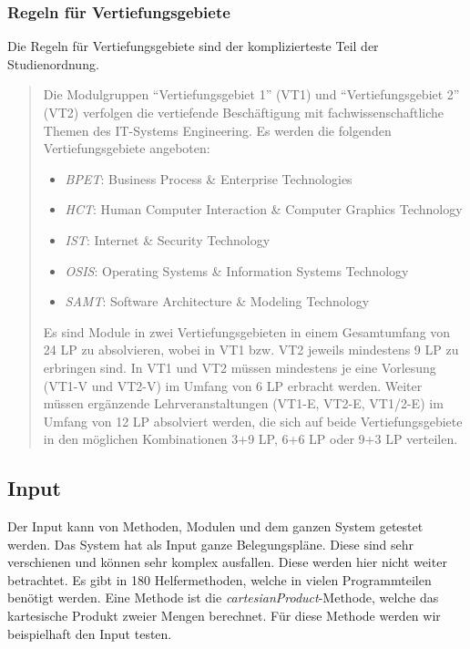 \documentclass[ngerman]{article}
\begin{document}
\subsubsection{Regeln für Vertiefungsgebiete}

Die Regeln für Vertiefungsgebiete sind der komplizierteste Teil der Studienordnung.
\begin{quote}
    \begin{displayquote}
Die Modulgruppen ``Vertiefungsgebiet 1'' (VT1) und ``Vertiefungsgebiet 2'' (VT2) verfolgen die vertiefende Beschäftigung mit fachwissenschaftliche Themen des IT-Systems Engineering.
Es werden die folgenden Vertiefungsgebiete angeboten:
\begin{itemize}
    \item \emph{BPET}: Business Process \& Enterprise Technologies
    \item \emph{HCT}: Human Computer Interaction \& Computer Graphics Technology
    \item \emph{IST}: Internet \& Security Technology
    \item \emph{OSIS}: Operating Systems \& Information Systems Technology
    \item \emph{SAMT}: Software Architecture \& Modeling Technology
\end{itemize}
Es sind Module in zwei Vertiefungsgebieten in einem Gesamtumfang von 24 LP zu absolvieren, wobei in VT1
bzw. VT2 jeweils mindestens 9 LP zu erbringen sind. In VT1 und VT2 müssen mindestens je eine Vorlesung
(VT1-V und VT2-V) im Umfang von 6 LP erbracht werden. Weiter müssen ergänzende Lehrveranstaltungen
(VT1-E, VT2-E, VT1/2-E) im Umfang von 12 LP absolviert werden, die sich auf beide Vertiefungsgebiete in
den möglichen Kombinationen 3+9 LP, 6+6 LP oder 9+3 LP verteilen. 
    \end{displayquote}
    \label{quo:vertiefungsgebiete}
\end{quote}

\subsection{Input}
Der Input kann von Methoden, Modulen und dem ganzen System getestet werden. Das System hat als Input ganze Belegungspläne. Diese sind sehr verschienen und können sehr komplex ausfallen. Diese werden hier nicht weiter betrachtet. 
Es gibt in 180 Helfermethoden, welche in vielen Programmteilen benötigt werden. Eine Methode ist die \emph{cartesianProduct}-Methode, welche das kartesische Produkt zweier Mengen berechnet. 
Für diese Methode werden wir beispielhaft den Input testen.
\end{document}
